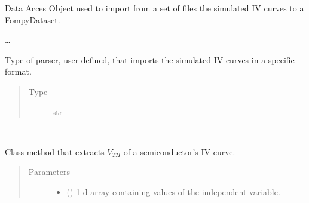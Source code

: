 \documentclass[letterpaper,10pt,english,openany, oneside]{sphinxmanual}
\begin{document}

\begin{fulllineitems}
\label{\detokenize{index:fompy.fds.daoFile}}
Data Acces Object used to import from a set of files the simulated IV curves to a FompyDataset.

…

\begin{fulllineitems}
\label{\detokenize{index:fompy.fds.daoFile.parser}}
Type of parser, user-defined, that imports the simulated IV curves in a specific format.
\begin{quote}\begin{description}
\item[{Type}] \leavevmode
str

\end{description}\end{quote}

\end{fulllineitems}


\begin{fulllineitems}
\label{\detokenize{index:fompy.fds.daoFile.load}}~

\begin{fulllineitems}
Class method that extracts \(V_{TH}\) of a semiconductor’s IV curve.

\end{fulllineitems}

\begin{quote}\begin{description}
\item[{Parameters}] \leavevmode\begin{itemize}
\item {} 
 (\sphinxstyleliteralemphasis{\sphinxupquote{, }}\sphinxstyleliteralemphasis{\sphinxupquote{ (}}\sphinxstyleliteralemphasis{\sphinxupquote{,}}\sphinxstyleliteralemphasis{\sphinxupquote{)}}) \textendash{} 1-d array containing values of the independent variable.


\end{itemize}
\end{description}
\end{quote}
\end{fulllineitems}
\end{fulllineitems}
\end{document}
